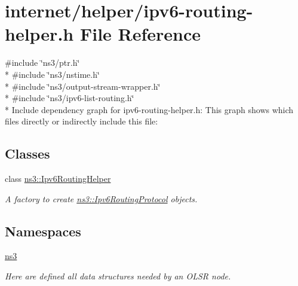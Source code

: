 \hypertarget{ipv6-routing-helper_8h}{}\section{internet/helper/ipv6-\/routing-\/helper.h File Reference}
\label{ipv6-routing-helper_8h}
{\ttfamily \#include \char`\"{}ns3/ptr.\+h\char`\"{}}\\*
{\ttfamily \#include \char`\"{}ns3/nstime.\+h\char`\"{}}\\*
{\ttfamily \#include \char`\"{}ns3/output-\/stream-\/wrapper.\+h\char`\"{}}\\*
{\ttfamily \#include \char`\"{}ns3/ipv6-\/list-\/routing.\+h\char`\"{}}\\*
Include dependency graph for ipv6-\/routing-\/helper.h\+:
This graph shows which files directly or indirectly include this file\+:
\subsection*{Classes}
\begin{DoxyCompactItemize}
\item 
class \hyperlink{classns3_1_1Ipv6RoutingHelper}{ns3\+::\+Ipv6\+Routing\+Helper}
\begin{DoxyCompactList}\small\item\em A factory to create \hyperlink{classns3_1_1Ipv6RoutingProtocol}{ns3\+::\+Ipv6\+Routing\+Protocol} objects. \end{DoxyCompactList}\end{DoxyCompactItemize}
\subsection*{Namespaces}
\begin{DoxyCompactItemize}
\item 
 \hyperlink{namespacens3}{ns3}
\begin{DoxyCompactList}\small\item\em Here are defined all data structures needed by an O\+L\+SR node. \end{DoxyCompactList}\end{DoxyCompactItemize}
